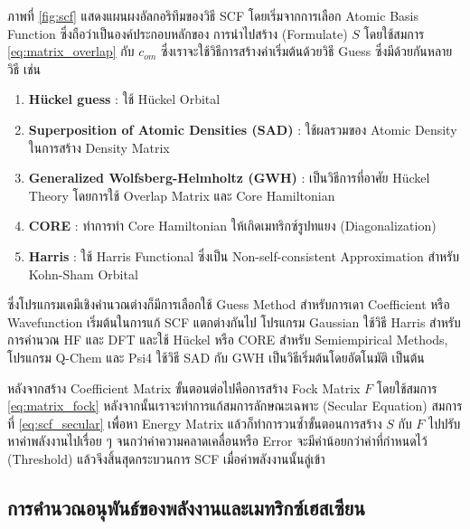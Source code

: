 ภาพที่ \ref{fig:scf} แสดงแผนผงอัลกอริทึมของวิธี SCF โดยเริ่มจากการเลือก Atomic Basis Function ซึ่งถือว่าเป็นองค์ประกอบหลักของ%
การนำไปสร้าง (Formulate) $S$ โดยใช้สมการ \ref{eq:matrix_overlap} กับ $c_{om}$ ซึ่งเราจะใช้วิธีการสร้างค่าเริ่มต้นด้วยวิธี Guess 
ซึ่งมีด้วยกันหลายวิธี เช่น

\begin{enumerate}
    \item \textbf{H{\"u}ckel guess} : ใช้ H{\"u}ckel Orbital\autocite{jensen2017}
    
    \item \textbf{Superposition of Atomic Densities (SAD)} : ใช้ผลรวมของ Atomic Density ในการสร้าง Density Matrix
    
    \item \textbf{Generalized Wolfsberg-Helmholtz (GWH)} : เป็นวิธีการที่อาศัย H{\"u}ckel Theory โดยการใช้ Overlap 
    Matrix และ Core Hamiltonian\autocite{wolfsberg1952}
    
    \item \textbf{CORE} : ทำการทำ Core Hamiltonian ให้เกิดเมทริกซ์รูปทแยง (Diagonalization)
    
    \item \textbf{Harris} : ใช้ Harris Functional ซึ่งเป็น Non-self-consistent Approximation สำหรับ Kohn-Sham 
    Orbital\autocite{harris1985}
\end{enumerate}

ซึ่งโปรแกรมเคมีเชิงคำนวณต่างก็มีการเลือกใช้ Guess Method สำหรับการเดา Coefficient หรือ Wavefunction เริ่มต้นในการแก้ SCF แตกต่างกันไป
โปรแกรม Gaussian ใช้วิธี Harris สำหรับการคำนวณ HF และ DFT และใช้ H{\"u}ckel หรือ CORE สำหรับ Semiempirical Methods, 
โปรแกรม Q-Chem และ Psi4 ใช้วิธี SAD กับ GWH เป็นวิธีเริ่มต้นโดยอัตโนมัติ เป็นต้น

หลังจากสร้าง Coefficient Matrix ขั้นตอนต่อไปคือการสร้าง Fock Matrix $F$ โดยใช้สมการ \ref{eq:matrix_fock} 
หลังจากนั้นเราจะทำการแก้สมการลักษณะเฉพาะ (Secular Equation) สมการที่ \ref{eq:scf_secular} เพื่อหา Energy Matrix 
แล้วก็ทำการวนซ้ำขั้นตอนการสร้าง $S$ กับ $F$ ไปปรับหาค่าพลังงานไปเรื่อย ๆ จนกว่าค่าความคลาดเคลื่อนหรือ Error จะมีค่าน้อยกว่าค่าที่กำหนดไว้ 
(Threshold) แล้วจึงสิ้นสุดกระบวนการ SCF เมื่อค่าพลังงานนั้นลู่เข้า

\subsection{การคำนวณอนุพันธ์ของพลังงานและเมทริกซ์เฮสเซียน}
\label{ssec:ener_der}


